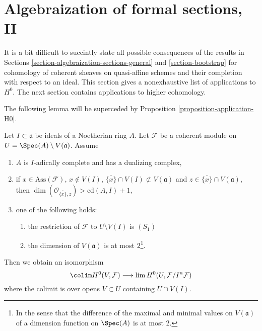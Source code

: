 \section{Algebraization of formal sections, II}
\label{section-algebraization-sections-coherent}

\noindent
It is a bit difficult to succintly state all possible
consequences of the results in
Sections \ref{section-algebraization-sections-general} and
\ref{section-bootstrap}
for cohomology of coherent sheaves on quasi-affine schemes
and their completion with respect to an ideal.
This section gives a nonexhaustive list of
applications to $H^0$. The next section contains
applications to higher cohomology.

\medskip\noindent
The following lemma will be superceded by
Proposition \ref{proposition-application-H0}.

\begin{lemma}
\label{lemma-application-H0-pre}
Let $I \subset \mathfrak a$ be ideals of a Noetherian ring $A$.
Let $\mathcal{F}$ be a coherent module on
$U = \Spec(A) \setminus V(\mathfrak a)$.
Assume
\begin{enumerate}
\item $A$ is $I$-adically complete and has a dualizing complex,
\item if $x \in \text{Ass}(\mathcal{F})$, $x \not \in V(I)$,
$\overline{\{x\}} \cap V(I) \not \subset V(\mathfrak a)$
and $z \in \overline{\{x\}} \cap V(\mathfrak a)$, then
$\dim(\mathcal{O}_{\overline{\{x\}}, z}) > \text{cd}(A, I) + 1$,
\item one of the following holds:
\begin{enumerate}
\item the restriction of $\mathcal{F}$ to $U \setminus V(I)$ is $(S_1)$
\item the dimension of $V(\mathfrak a)$ is at most $2$\footnote{In
the sense that the difference of the maximal and minimal values
on $V(\mathfrak a)$ of a dimension function on $\Spec(A)$ is at most $2$.}.
\end{enumerate}
\end{enumerate}
Then we obtain an isomorphism
$$
\colim H^0(V, \mathcal{F})
\longrightarrow
\lim H^0(U, \mathcal{F}/I^n\mathcal{F})
$$
where the colimit is over opens $V \subset U$ containing $U \cap V(I)$.
\end{lemma}

